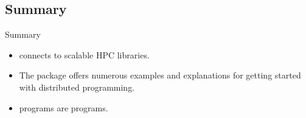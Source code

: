 \subsection{Summary}

\begin{frame}
  \begin{block}{Summary}
    \begin{itemize}
      \item \pbdR connects \R to scalable HPC libraries.
      \item The  package offers numerous examples and explanations 
for getting started with distributed \R programming.
      \item \pbdR programs are \R programs.
    \end{itemize}
  \end{block}
\end{frame}